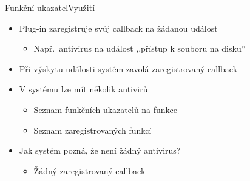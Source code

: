 \begin{frame}{Funkční ukazatel}{Využití}

  \begin{itemize}
    \item Plug-in zaregistruje svůj callback na žádanou událost
    \begin{itemize}
      \item Např.\ antivirus na událost ,,přístup k souboru na disku''
    \end{itemize}

    \pause

    \item Při výskytu události systém zavolá zaregistrovaný callback

    \pause

    \item V systému lze mít několik antivirů
    \begin{itemize}
      \item Seznam funkčních ukazatelů na funkce
      \item Seznam zaregistrovaných funkcí 
    \end{itemize}

    \pause

    \item Jak systém pozná, že není žádný antivirus?

    \pause

    \begin{itemize}
      \item Žádný zaregistrovaný callback
    \end{itemize}

  \end{itemize}

\end{frame}

